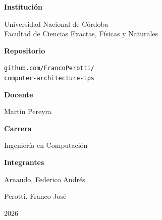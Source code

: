 \begin{titlepage}
\begin{minipage}[t]{0.45\textwidth}
	\raggedright
	{\color{technicalviolet}\bfseries Institución\par}
	\vspace{0.18cm}
	Universidad Nacional de Córdoba\\
	Facultad de Ciencias Exactas, Físicas y Naturales\\[0.55cm]
	{\color{technicalviolet}\bfseries Repositorio\par}
	\vspace{0.18cm}
	\small\texttt{github.com/FrancoPerotti/}\\
	\texttt{computer-architecture-tps}
\end{minipage}
\hfill
\begin{minipage}[t]{0.43\textwidth}
	\raggedright
	{\color{technicalviolet}\bfseries Docente\par}
	\vspace{0.18cm}
	Martín Pereyra\\[0.55cm]
	{\color{technicalviolet}\bfseries Carrera\par}
	\vspace{0.18cm}
	Ingeniería en Computación
\end{minipage}

\vspace{0.85cm}

\begin{minipage}{0.92\textwidth}
	{\color{technicalviolet}\bfseries Integrantes\par}
	\vspace{0.2cm}
	\small
	\begin{minipage}[t]{0.46\linewidth}
		\raggedright Arnaudo, Federico Andrés
	\end{minipage}
	\hfill
	\begin{minipage}[t]{0.46\linewidth}
		\raggedright Perotti, Franco José
	\end{minipage}
\end{minipage}

\vspace{0.65cm}
{\Large 2026\par}

\end{titlepage}
